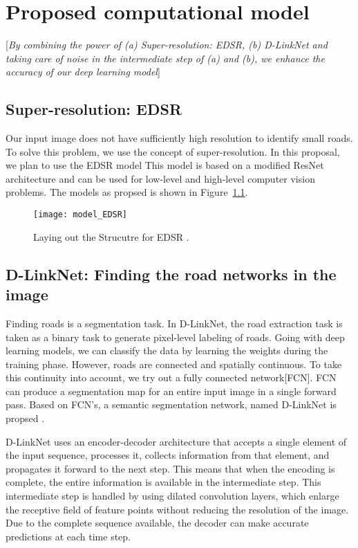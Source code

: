 \chapter{Proposed computational model}\label{chapt:model}
[\textit{By combining the power of (a) Super-resolution: EDSR, (b) D-LinkNet and taking care of noise in the intermediate step of (a) and (b), we enhance the accuracy of our deep learning model}]

\section{Super-resolution: EDSR}
Our input image does not have sufficiently high resolution to identify small roads. To solve this problem, we use the concept of super-resolution. In this proposal, we plan to use the EDSR model %
This model is based on a modified ResNet architecture and can be used for low-level and high-level computer vision problems. The models as propsed \cite{EDSR} is shown in Figure~\ref{fig:model_EDSR}. \par

\begin{figure}[h!]
  \centering
  \texttt{[image: model\_EDSR]}
  \caption{Laying out the Strucutre for EDSR \cite{EDSR}.}
  \label{fig:model_EDSR}
\end{figure}

\section{D-LinkNet: Finding the road networks in the image}
Finding roads is a segmentation task. In D-LinkNet, the road extraction task is taken as a binary task to generate pixel-level labeling of roads. Going with deep learning models, we can classify the data by learning the weights during the training phase. However, roads are connected and spatially continuous. To take this continuity into account, we try out a fully connected network[FCN]. FCN can produce a segmentation map for an entire input image in a single forward pass. Based on FCN's, a semantic segmentation network, named D-LinkNet is propsed \cite{D-LinkNet}. \par

D-LinkNet uses an encoder-decoder architecture that accepts a single element of the input sequence, processes it, collects information from that element, and propagates it forward to the next step. This means that when the encoding is complete, the entire information is available in the intermediate step. This intermediate step is handled by using dilated convolution layers, which enlarge the receptive field of feature points without reducing the resolution of the image. Due to the complete sequence available, the decoder can make accurate predictions at each time step. \par


